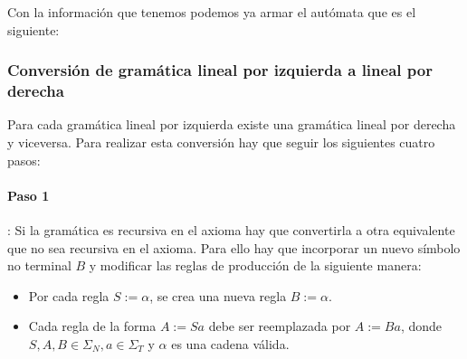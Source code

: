 \documentclass[12pt]{article}
\begin{document}
Con la información que tenemos podemos ya armar el autómata que es el siguiente:
\begin{center}
\end{center}


\subsubsection{Conversión de gramática lineal por izquierda a lineal por derecha}
Para cada gramática lineal por izquierda existe una gramática lineal por derecha y viceversa. Para realizar esta conversión hay que seguir los siguientes cuatro pasos:

\paragraph{Paso 1}\mbox{}: Si la gramática es recursiva en el axioma hay que convertirla a otra equivalente que no sea recursiva en el axioma. Para ello hay que incorporar un nuevo símbolo no terminal $ B $ y modificar las reglas de producción de la siguiente manera:
\begin{itemize}
  \item Por cada regla $ S:=\alpha $, se crea una nueva regla $ B:=\alpha $.

  \item Cada regla de la forma $ A:=Sa $ debe ser reemplazada por $ A:=Ba $, donde $ S,A,B \in \Sigma_{N}, a \in \Sigma_{T} $ y $ \alpha $ es una cadena válida.
\end{itemize}
\end{document}
